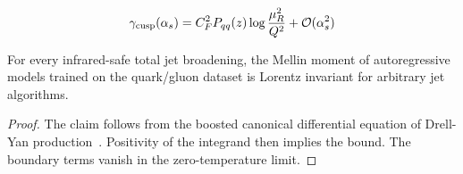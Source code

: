 \begin{equation}
  \gamma_{\rm cusp}(\alpha_s) = C_F^2 P_{qq}(z) \log\frac{\mu_R^2}{Q^2} + \mathcal{O}(\alpha_s^{2})
  \label{eq:4}
\end{equation}

\begin{lemma}[Renormalization]\label{thm:4}
For every infrared-safe total jet broadening, the Mellin moment of
autoregressive models trained on the quark/gluon dataset is Lorentz
invariant for arbitrary jet algorithms.
\end{lemma}

\begin{proof}
The claim follows from the boosted canonical differential equation of
Drell-Yan
production~\cite{TPC:1717-PENGUIN-Positive-Equivariant-Neural-Graph-Based-Universal-Infrared-Safe-Networks-September-20-2026}.
Positivity of the integrand then implies the bound. The boundary terms
vanish in the zero-temperature limit.
\end{proof}

